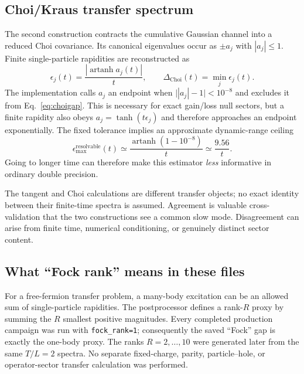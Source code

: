\documentclass[aps,prb,onecolumn,nofootinbib,superscriptaddress]{revtex4-2}
\begin{document}
\subsection{Choi/Kraus transfer spectrum}

The second construction contracts the cumulative Gaussian channel into a reduced Choi
covariance.  Its canonical eigenvalues occur as $\pm a_j$ with $|a_j|\leq1$.  Finite
single-particle rapidities are reconstructed as
\begin{equation}
 \epsilon_j(t)=\frac{|\operatorname{artanh}a_j(t)|}{t},
 \qquad
 \Delta_{\mathrm{Choi}}(t)=\min_j\epsilon_j(t).
 \label{eq:choigap}
\end{equation}
The implementation calls $a_j$ an endpoint when
$\bigl||a_j|-1\bigr|<10^{-8}$ and excludes it from Eq.~\eqref{eq:choigap}.  This is necessary
for exact gain/loss null sectors, but a finite rapidity also obeys
$a_j=\tanh(t\epsilon_j)$ and therefore approaches an endpoint exponentially.  The fixed
tolerance implies an approximate dynamic-range ceiling
\begin{equation}
 \epsilon_{\max}^{\mathrm{resolvable}}(t)
 \simeq \frac{\operatorname{artanh}(1-10^{-8})}{t}
 \simeq \frac{9.56}{t}.
 \label{eq:dynamicrange}
\end{equation}
Going to longer time can therefore make this estimator \emph{less} informative in ordinary
double precision.

The tangent and Choi calculations are different transfer objects; no exact identity between
their finite-time spectra is assumed.  Agreement is valuable cross-validation that the two
constructions see a common slow mode.  Disagreement can arise from finite time, numerical
conditioning, or genuinely distinct sector content.

\subsection{What ``Fock rank'' means in these files}

For a free-fermion transfer problem, a many-body excitation can be an allowed sum of
single-particle rapidities.  The postprocessor defines a rank-$R$ proxy by summing the $R$
smallest positive magnitudes.  Every completed production campaign was run with
\texttt{fock\_rank=1}; consequently the saved ``Fock'' gap is exactly the one-body proxy.
The ranks $R=2,\ldots,10$ were generated later from the same $T/L=2$ spectra.  No separate
fixed-charge, parity, particle--hole, or operator-sector transfer calculation was performed.
\end{document}
